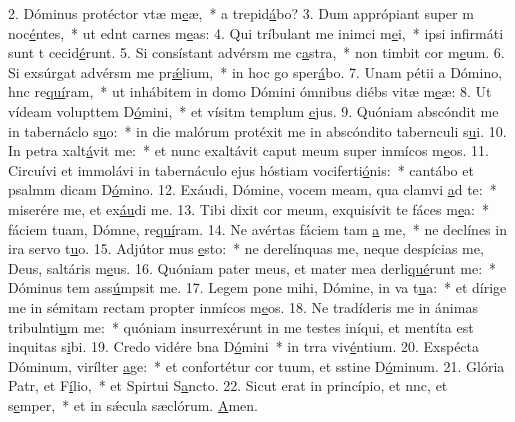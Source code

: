 2. Dóminus protéctor vtæ m\uline{e}æ,~* a  trepid\uline{á}bo?
3. Dum apprópiant super m noc\uline{é}ntes,~* ut ednt carnes m\uline{e}as:
4. Qui tríbulant me inimci m\uline{e}i,~* ipsi infirmáti sunt t cecid\uline{é}runt.
5. Si consístant advérsm me c\uline{a}stra,~* non timbit cor m\uline{e}um.
6. Si exsúrgat advérsm me pr\uline{ǽ}lium,~* in hoc go sper\uline{á}bo.
7. Unam pétii a Dómino, hnc re\uline{quí}ram,~* ut inhábitem in domo Dómini ómnibus diébs vitæ m\uline{e}æ:
8. Ut vídeam volupttem D\uline{ó}mini,~* et vísitm templum \uline{e}jus.
9. Quóniam abscóndit me in tabernáclo s\uline{u}o:~* in die malórum protéxit me in abscóndito tabernculi s\uline{u}i.
10. In petra xalt\uline{á}vit me:~* et nunc exaltávit caput meum super inmícos m\uline{e}os.
11. Circuívi et immolávi in tabernáculo ejus hóstiam vociferti\uline{ó}nis:~* cantábo et psalmm dicam D\uline{ó}mino.
12. Exáudi, Dómine, vocem meam, qua clamvi \uline{a}d te:~* miserére me, et ex\uline{áu}di me.
13. Tibi dixit cor meum, exquisívit te fáces m\uline{e}a:~* fáciem tuam, Dómne, re\uline{quí}ram.
14. Ne avértas fáciem tam \uline{a} me,~* ne declínes in ira  servo t\uline{u}o.
15. Adjútor mus \uline{e}sto:~* ne derelínquas me, neque despícias me, Deus, saltáris m\uline{e}us.
16. Quóniam pater meus, et mater mea derli\uline{qué}runt me:~* Dóminus tem ass\uline{ú}mpsit me.
17. Legem pone mihi, Dómine, in va t\uline{u}a:~* et dírige me in sémitam rectam propter inmícos m\uline{e}os.
18. Ne tradíderis me in ánimas tribulnti\uline{u}m me:~* quóniam insurrexérunt in me testes iníqui, et mentíta est inquitas s\uline{i}bi.
19. Credo vidére bna D\uline{ó}mini~* in trra viv\uline{é}ntium.
20. Exspécta Dóminum, virílter \uline{a}ge:~* et confortétur cor tuum, et sstine D\uline{ó}minum.
21. Glória Patr, et F\uline{í}lio,~* et Spirtui S\uline{a}ncto.
22. Sicut erat in princípio, et nnc, et s\uline{e}mper,~* et in sǽcula sæclórum. \uline{A}men.
